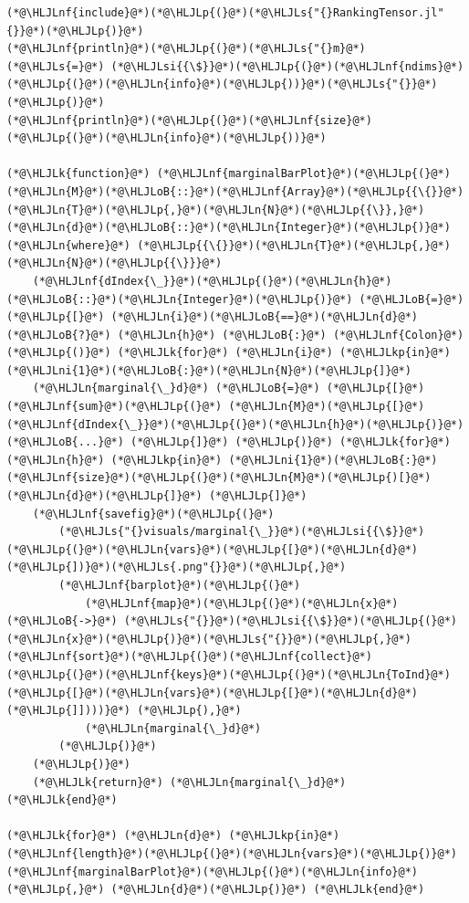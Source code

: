 \documentclass[12pt,a4paper]{article}
\newcommand{\HLJLk}[1]{\textcolor[RGB]{148,91,176}{\textbf{#1}}}
\newcommand{\HLJLkp}[1]{\textcolor[RGB]{148,91,176}{\textbf{#1}}}
\newcommand{\HLJLn}[1]{#1}
\newcommand{\HLJLnf}[1]{\textcolor[RGB]{66,102,213}{#1}}
\newcommand{\HLJLs}[1]{\textcolor[RGB]{201,61,57}{#1}}
\newcommand{\HLJLsi}[1]{#1}
\newcommand{\HLJLni}[1]{\textcolor[RGB]{59,151,46}{#1}}
\newcommand{\HLJLoB}[1]{\textcolor[RGB]{102,102,102}{\textbf{#1}}}
\newcommand{\HLJLp}[1]{#1}
\begin{document}
\begin{lstlisting}
(*@\HLJLnf{include}@*)(*@\HLJLp{(}@*)(*@\HLJLs{"{}RankingTensor.jl"{}}@*)(*@\HLJLp{)}@*)
(*@\HLJLnf{println}@*)(*@\HLJLp{(}@*)(*@\HLJLs{"{}m}@*) (*@\HLJLs{=}@*) (*@\HLJLsi{{\$}}@*)(*@\HLJLp{(}@*)(*@\HLJLnf{ndims}@*)(*@\HLJLp{(}@*)(*@\HLJLn{info}@*)(*@\HLJLp{))}@*)(*@\HLJLs{"{}}@*)(*@\HLJLp{)}@*)
(*@\HLJLnf{println}@*)(*@\HLJLp{(}@*)(*@\HLJLnf{size}@*)(*@\HLJLp{(}@*)(*@\HLJLn{info}@*)(*@\HLJLp{))}@*)

(*@\HLJLk{function}@*) (*@\HLJLnf{marginalBarPlot}@*)(*@\HLJLp{(}@*)(*@\HLJLn{M}@*)(*@\HLJLoB{::}@*)(*@\HLJLnf{Array}@*)(*@\HLJLp{{\{}}@*)(*@\HLJLn{T}@*)(*@\HLJLp{,}@*)(*@\HLJLn{N}@*)(*@\HLJLp{{\}},}@*) (*@\HLJLn{d}@*)(*@\HLJLoB{::}@*)(*@\HLJLn{Integer}@*)(*@\HLJLp{)}@*) (*@\HLJLn{where}@*) (*@\HLJLp{{\{}}@*)(*@\HLJLn{T}@*)(*@\HLJLp{,}@*)(*@\HLJLn{N}@*)(*@\HLJLp{{\}}}@*)
	(*@\HLJLnf{dIndex{\_}}@*)(*@\HLJLp{(}@*)(*@\HLJLn{h}@*)(*@\HLJLoB{::}@*)(*@\HLJLn{Integer}@*)(*@\HLJLp{)}@*) (*@\HLJLoB{=}@*) (*@\HLJLp{[}@*) (*@\HLJLn{i}@*)(*@\HLJLoB{==}@*)(*@\HLJLn{d}@*) (*@\HLJLoB{?}@*) (*@\HLJLn{h}@*) (*@\HLJLoB{:}@*) (*@\HLJLnf{Colon}@*)(*@\HLJLp{()}@*) (*@\HLJLk{for}@*) (*@\HLJLn{i}@*) (*@\HLJLkp{in}@*) (*@\HLJLni{1}@*)(*@\HLJLoB{:}@*)(*@\HLJLn{N}@*)(*@\HLJLp{]}@*)
	(*@\HLJLn{marginal{\_}d}@*) (*@\HLJLoB{=}@*) (*@\HLJLp{[}@*)(*@\HLJLnf{sum}@*)(*@\HLJLp{(}@*) (*@\HLJLn{M}@*)(*@\HLJLp{[}@*) (*@\HLJLnf{dIndex{\_}}@*)(*@\HLJLp{(}@*)(*@\HLJLn{h}@*)(*@\HLJLp{)}@*)(*@\HLJLoB{...}@*) (*@\HLJLp{]}@*) (*@\HLJLp{)}@*) (*@\HLJLk{for}@*) (*@\HLJLn{h}@*) (*@\HLJLkp{in}@*) (*@\HLJLni{1}@*)(*@\HLJLoB{:}@*)(*@\HLJLnf{size}@*)(*@\HLJLp{(}@*)(*@\HLJLn{M}@*)(*@\HLJLp{)[}@*)(*@\HLJLn{d}@*)(*@\HLJLp{]}@*) (*@\HLJLp{]}@*)
	(*@\HLJLnf{savefig}@*)(*@\HLJLp{(}@*)
		(*@\HLJLs{"{}visuals/marginal{\_}}@*)(*@\HLJLsi{{\$}}@*)(*@\HLJLp{(}@*)(*@\HLJLn{vars}@*)(*@\HLJLp{[}@*)(*@\HLJLn{d}@*)(*@\HLJLp{])}@*)(*@\HLJLs{.png"{}}@*)(*@\HLJLp{,}@*)
		(*@\HLJLnf{barplot}@*)(*@\HLJLp{(}@*)
			(*@\HLJLnf{map}@*)(*@\HLJLp{(}@*)(*@\HLJLn{x}@*)(*@\HLJLoB{->}@*) (*@\HLJLs{"{}}@*)(*@\HLJLsi{{\$}}@*)(*@\HLJLp{(}@*)(*@\HLJLn{x}@*)(*@\HLJLp{)}@*)(*@\HLJLs{"{}}@*)(*@\HLJLp{,}@*) (*@\HLJLnf{sort}@*)(*@\HLJLp{(}@*)(*@\HLJLnf{collect}@*)(*@\HLJLp{(}@*)(*@\HLJLnf{keys}@*)(*@\HLJLp{(}@*)(*@\HLJLn{ToInd}@*)(*@\HLJLp{[}@*)(*@\HLJLn{vars}@*)(*@\HLJLp{[}@*)(*@\HLJLn{d}@*)(*@\HLJLp{]])))}@*) (*@\HLJLp{),}@*)
			(*@\HLJLn{marginal{\_}d}@*)
		(*@\HLJLp{)}@*)
	(*@\HLJLp{)}@*)
	(*@\HLJLk{return}@*) (*@\HLJLn{marginal{\_}d}@*)
(*@\HLJLk{end}@*)

(*@\HLJLk{for}@*) (*@\HLJLn{d}@*) (*@\HLJLkp{in}@*) (*@\HLJLnf{length}@*)(*@\HLJLp{(}@*)(*@\HLJLn{vars}@*)(*@\HLJLp{)}@*) (*@\HLJLnf{marginalBarPlot}@*)(*@\HLJLp{(}@*)(*@\HLJLn{info}@*)(*@\HLJLp{,}@*) (*@\HLJLn{d}@*)(*@\HLJLp{)}@*) (*@\HLJLk{end}@*)
\end{lstlisting}
\end{document}
